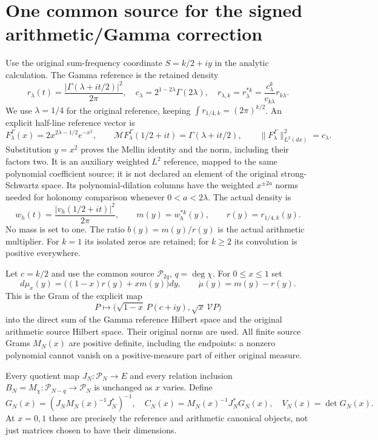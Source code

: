 \documentclass[11pt]{article}
\begin{document}
\section{One common source for the signed arithmetic/Gamma correction}
Use the original sum-frequency coordinate $S=k/2+iy$ in the analytic calculation. The Gamma reference is the retained density
\[
 r_\lambda(t)=\frac{|\Gamma(\lambda+it/2)|^2}{2\pi},
 \quad c_\lambda=2^{1-2\lambda}\Gamma(2\lambda),\quad
 r_{\lambda,k}=r_\lambda^{*k}=\frac{c_\lambda^k}{c_{k\lambda}}r_{k\lambda}.
 \tag{47}
\]
We use $\lambda=1/4$ for the original reference, keeping $\int r_{1/4,k}=(2\pi)^{k/2}$. An explicit half-line reference vector is
\[
 F_\lambda^\Gamma(x)=2x^{2\lambda-1/2}e^{-x^2},\qquad
 \mathcal MF_\lambda^\Gamma(1/2+it)=\Gamma(\lambda+it/2),\qquad
 \|F_\lambda^\Gamma\|_{L^2(dx)}^2=c_\lambda.
 \tag{47a}
\]
Substitution $y=x^2$ proves the Mellin identity and the norm, including their factors two. It is an auxiliary weighted $L^2$ reference, mapped to the same polynomial coefficient source; it is not declared an element of the original strong-Schwartz space. Its polynomial-dilation columns have the weighted $x^{\pm2a}$ norms needed for holonomy comparison whenever $0<a<2\lambda$. The actual density is
\[
 w_h(t)=\frac{|v_h(1/2+it)|^2}{2\pi},
 \qquad m(y)=w_h^{*k}(y),\qquad r(y)=r_{1/4,k}(y).
 \tag{48}
\]
No mass is set to one. The ratio $b(y)=m(y)/r(y)$ is the actual arithmetic multiplier. For $k=1$ its isolated zeros are retained; for $k\ge2$ its convolution is positive everywhere.

Let $c=k/2$ and use the common source $\mathcal P_{2q}$, $q=\deg\chi$. For $0\le x\le1$ set
\[
 d\mu_x(y)=\bigl((1-x)r(y)+xm(y)\bigr)dy,
 \qquad\dot\mu(y)=m(y)-r(y).
 \tag{49}
\]
This is the Gram of the explicit map
\[
 P\longmapsto\bigl(\sqrt{1-x}\,P(c+iy),
                    \sqrt{x}\,\mathcal VP\bigr)
\tag{50}
\]
into the direct sum of the Gamma reference Hilbert space and the original arithmetic source Hilbert space. Their original norms are used. All finite source Grams $M_N(x)$ are positive definite, including the endpoints: a nonzero polynomial cannot vanish on a positive-measure part of either original measure.

Every quotient map $J_N:\mathcal P_N\to E$ and every relation inclusion $B_N= M_\chi:\mathcal P_{N-q}\to\mathcal P_N$ is unchanged as $x$ varies. Define
\[
 G_N(x)=(J_NM_N(x)^{-1}J_N^*)^{-1},
 \quad C_N(x)=M_N(x)^{-1}J_N^*G_N(x),
 \quad V_N(x)=\det G_N(x).
 \tag{51}
\]
At $x=0,1$ these are precisely the reference and arithmetic canonical objects, not just matrices chosen to have their dimensions.
\end{document}
